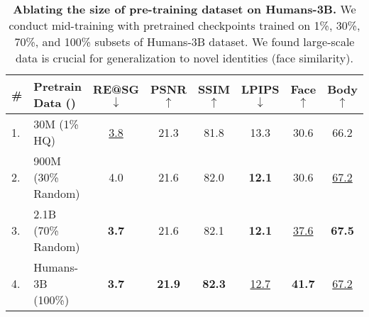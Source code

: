 

\begin{table}[h!]
    \centering
    \small
    \setlength{\tabcolsep}{1pt}
    \begin{tabular}{llcccccc}
        \toprule

         {\#} & \textbf{Pretrain Data (\mid@128)} & RE@SG $\downarrow$ & PSNR $\uparrow$ & SSIM $\uparrow$ & LPIPS $\downarrow$  & Face $\uparrow$ & Body $\uparrow$ \\

        \midrule





        {1.} & 30M (1\% HQ) &  \underline{3.8} & 21.3 & 81.8 & 13.3 & {30.6} & {66.2} \\

        {2.} & 900M (30\% Random)   &   4.0 & 21.6 & 82.0 & \textbf{12.1} & {30.6} & \underline{67.2} \\

        {3.} & 2.1B (70\% Random) &   \textbf{3.7} & 21.6 & 82.1 & \textbf{12.1} & \underline{37.6} & \textbf{67.5} \\

        {4.} & Humans-3B (100\%) &  \textbf{3.7} & \textbf{21.9} & \textbf{82.3} & \underline{12.7} & \textbf{41.7} & \underline{67.2} \\

        \bottomrule
    \end{tabular}
    \vspace{-8pt}
    \caption{\textbf{Ablating the size of pre-training dataset on Humans-3B.} We conduct \fullbody mid-training with pretrained checkpoints trained on 1\%, 30\%, 70\%, and 100\% subsets of Humans-3B dataset. We found large-scale data is crucial for generalization to novel identities (\ie face similarity).}
    \label{tab:dataset_ablation}

\end{table}


